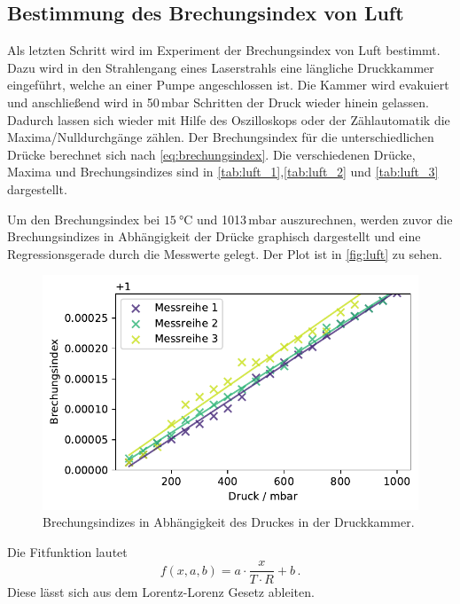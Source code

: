 \subsection{Bestimmung des Brechungsindex von Luft}
Als letzten Schritt wird im Experiment der Brechungsindex von Luft bestimmt.
Dazu wird in den Strahlengang eines Laserstrahls eine längliche Druckkammer eingeführt, welche an einer
Pumpe angeschlossen ist. Die Kammer wird evakuiert und anschließend wird in 50\,mbar Schritten der Druck
wieder hinein gelassen.
Dadurch lassen sich wieder mit Hilfe des Oszilloskops oder der Zählautomatik die Maxima/Nulldurchgänge zählen.
Der Brechungsindex für die unterschiedlichen Drücke berechnet sich nach \autoref{eq:brechungsindex}.
Die verschiedenen Drücke, Maxima und Brechungsindizes sind in \autoref{tab:luft_1},\autoref{tab:luft_2} und \autoref{tab:luft_3}
dargestellt.



\FloatBarrier
Um den Brechungsindex bei $\SI{15}{\celsius}$ und 1013\,mbar auszurechnen, werden zuvor die Brechungsindizes
in Abhängigkeit der Drücke graphisch dargestellt und eine Regressionsgerade durch die Messwerte gelegt.
Der Plot ist in \autoref{fig:luft} zu sehen.
\begin{figure}
    \centering
    \includegraphics[width=0.8\linewidth]{Plots/Brechungsindex.pdf}
    \caption{Brechungsindizes in Abhängigkeit des Druckes in der Druckkammer.}
    \label{fig:luft}
\end{figure}
\FloatBarrier
Die Fitfunktion lautet 
\begin{equation*}
    f(x, a, b) = a \cdot \frac{x}{T \cdot R} + b \, .
    \label{eqn:fit}
\end{equation*}
Diese lässt sich aus dem Lorentz-Lorenz Gesetz ableiten.
